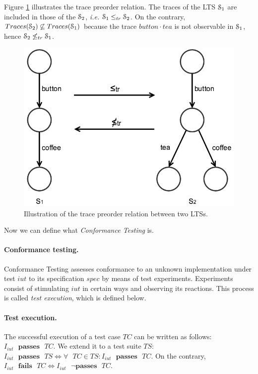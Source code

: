 \begin{example}
    Figure \ref{fig:trace_preorder} illustrates the trace
    preorder relation. The traces of the LTS $\EuScript{S}_1$ are
    included in those of the $\EuScript{S}_2$, \emph{i.e.}
    $\EuScript{S}_1 \leq_{tr} \EuScript{S}_2$.  On the contrary,
    $Traces(\EuScript{S}_2) \not\subseteq Traces(\EuScript{S}_1)$
    because the trace $button \cdot tea$ is not observable in
    $\EuScript{S}_1$, hence $\EuScript{S}_2 \not\leq_{tr}
    \EuScript{S}_1$.

    \begin{figure}[ht]
        \begin{center}
            \includegraphics[width=0.7\linewidth]{figures/trace_preorder.png}
        \end{center}

        \caption{Illustration of the trace preorder relation
        between two LTSs.}
        \label{fig:trace_preorder}
    \end{figure}

    \label{example:trace_preorder}
\end{example}

Now we can define what \emph{Conformance Testing} is.

\paragraph{Conformance testing.} Conformance Testing
assesses conformance to an unknown implementation under test
$iut$ to its specification $spec$ by means of test experiments.
Experiments consist of stimulating $iut$ in certain ways and
observing its reactions. This process is called \textit{test
execution}, which is defined below.

\paragraph{Test execution.} The successful execution of a test
case $TC$ can be written as follows: $I_{iut} \text{ }
\mathbf{passes} \text{ } TC$. We extend it to a test
suite $TS$: $I_{iut} \text{ } \mathbf{passes} \text{ } TS
\Leftrightarrow \forall \text{ } TC \in TS : I_{iut} \text{ }
\mathbf{passes} \text{ } TC$. On the contrary, $I_{iut} \text{ }
\mathbf{fails} \text{ } TC \Leftrightarrow I_{iut} \text{ } \neg
\mathbf{passes} \text{ } TC$.

